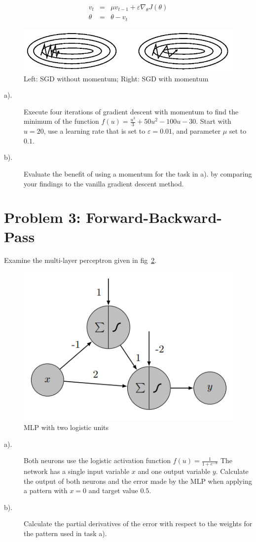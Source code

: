 \documentclass[12pt]{article}
\begin{document}
\begin{eqnarray*}
	v_t & = & \mu v_{t-1} + \varepsilon \nabla_\theta J(\theta)  \\ 
	\theta & =& \theta - v_t 
\end{eqnarray*}

\begin{figure}[!htbp]
	\centering 
	\includegraphics[width=.7\textwidth]{fig/2018-03-19-13-38-08.png}
	\caption{Left: SGD without momentum; Right: SGD with momentum} \label{fig:momentum}
\end{figure}


\begin{description}
	\item[a).] Execute four iterations of gradient descent with momentum to find the minimum of
	the function $f(u) = \frac{u^3}{3} + 50 u^2-100u-30$. Start with $u = 20$, use a learning rate
	that is set to $\varepsilon = 0.01$, and parameter $\mu$ set to $0.1$.
	\item[b).] Evaluate the benefit of using a momentum for the task in a). by comparing your
	findings to the vanilla gradient descent method.
\end{description}

\section{Problem 3: Forward-Backward-Pass} 
Examine the multi-layer perceptron given in fig~\ref{fig:mlp}.

\begin{figure}[!htbp]
	\centering
	\includegraphics[width=.5\textwidth]{fig/2018-03-19-13-49-49.png}
	\caption{MLP with two logistic units} \label{fig:mlp}
\end{figure}

\begin{description}
\item[a).]	Both neurons use the logistic activation function 
$f(u)=\frac{1}{1+e^{-u}}$
The network has 
a single input variable $x$ and one output variable $y$. Calculate the output of both
neurons and the error made by the MLP when applying a pattern with $x = 0$ and
target value $0.5$.
\item[b).] Calculate the partial derivatives of the error with respect to the weights for the
pattern used in task a). 
\end{description}
\end{document}
